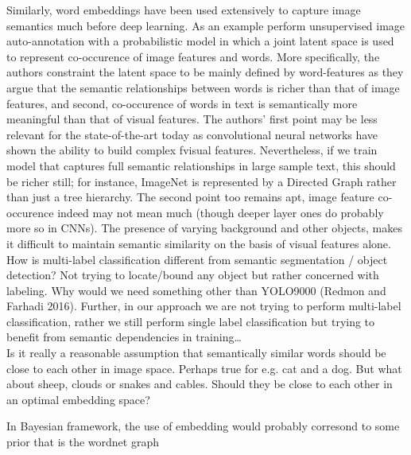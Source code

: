 \documentclass{report}
\begin{document}
Similarly, word embeddings have been used extensively to capture image semantics much before deep learning. As an example \cite{MonayPLSA} perform unsupervised image auto-annotation with a probabilistic model in which a joint latent space is used to represent co-occurence of image features and words. More specifically, the authors constraint the latent space to be mainly defined by word-features as they argue that the semantic relationships between words is richer than that of image features, and second, co-occurence of words in text is semantically more meaningful than that of visual features. The authors' first point may be less relevant for the state-of-the-art today as convolutional neural networks have shown the ability to build complex fvisual features. Nevertheless, if we train model that captures full semantic relationships in large sample text, this should be richer still; for instance, ImageNet is represented by a Directed Graph rather than just a tree hierarchy. The second point too remains apt, image feature co-occurence indeed may not mean much (though deeper layer ones do probably more so in CNNs). The presence of varying background and other objects, makes it difficult to maintain semantic similarity on the basis of visual features alone.  \\

How is multi-label classification different from semantic segmentation / object detection? Not trying to locate/bound any object but rather concerned with labeling. Why would we need something other than YOLO9000 (Redmon and Farhadi 2016). Further, in our approach we are not trying to perform multi-label classification, rather we still perform single label classification but trying to benefit from semantic dependencies in training\dots \\


Is it really a reasonable assumption that semantically similar words should be close to each other in image space. Perhaps true for e.g. cat and a dog. But what about sheep, clouds or snakes and cables. Should they be close to each other in an optimal embedding space? 

In Bayesian framework, the use of embedding would probably corresond to some prior that is the wordnet graph




\end{document}
